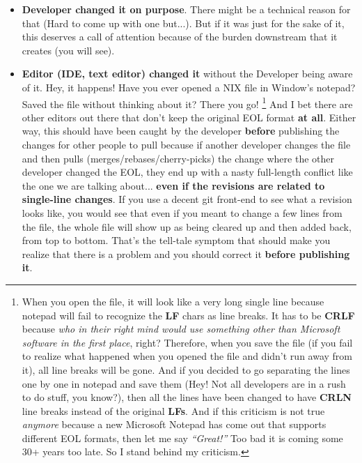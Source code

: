 \begin{itemize}
	\item {\bf Developer changed it on purpose}. There might be a technical reason for that (Hard to come up with one but...).
	But if it was just for the sake of it, this deserves a call of attention because of the burden downstream that it creates
	(you will see).
	
	\item {\bf Editor (IDE, text editor) changed it} without the Developer being aware of it. Hey, it happens! Have you ever opened
	a NIX file in Window's notepad? Saved the file without thinking about it? There you go!
	\footnote{When you open the file, it will look like a very long single line because notepad will fail to recognize the {\bf LF}
	chars as line breaks. It has to be {\bf CRLF} because {\it who in their right mind would use something other than Microsoft software
	in the first place}, right? Therefore, when you save the file (if you fail to realize what happened when you opened the file and
	didn't run away from it), all line breaks will be gone. And if you decided to go separating the lines one by one in notepad and
	save them (Hey! Not all developers are in a rush to do stuff, you know?), then all the lines have been changed to have
	{\bf CRLN} line breaks instead of the original {\bf LFs}. And if this criticism is not true {\it anymore} because a new Microsoft
	Notepad has come out that supports different EOL formats, then let me say {\it “Great!”} Too bad it is coming some 30+ years too
	late. So I stand behind my criticism.}
	And I bet there are other editors out there that don't keep the original EOL format {\bf at all}. Either way, this should have been
	caught by the developer {\bf before} publishing the changes for other people to pull because if another developer changes the file
	and then pulls (merges/rebases/cherry-picks) the change where the other developer changed the EOL, they end up with a nasty
	full-length conflict like the one we are talking about... {\bf even if the revisions are related to single-line changes}. If you use
	a decent git front-end to see what a revision looks like, you would see that even if you meant to change a few lines from the
	file, the whole file will show up as being cleared up and then added back, from top to bottom. That's the tell-tale symptom
	that should make you realize that there is a problem and you should correct it {\bf before publishing it}.
	

\end{itemize}
